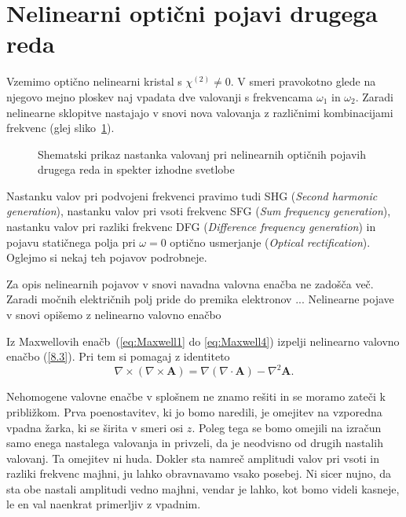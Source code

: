 \section{Nelinearni optični pojavi drugega reda}
Vzemimo optično nelinearni kristal s $\chi^{(2)} \neq 0$. V smeri pravokotno 
glede na njegovo mejno ploskev naj vpadata dve valovanji s frekvencama
$\omega_{1}$ in $\omega_{2}$. Zaradi nelinearne sklopitve nastajajo v snovi nova 
valovanja z različnimi kombinacijami frekvenc (glej sliko~\ref{fig:nl2}).
\begin{figure}[h]
\centering
\def\svgwidth{140truemm} 

\caption{Shematski prikaz nastanka valovanj pri nelinearnih optičnih pojavih drugega reda in spekter
izhodne svetlobe}
\label{fig:nl2}
\end{figure}

Nastanku valov pri podvojeni frekvenci pravimo tudi
SHG ({\it Second harmonic 
generation}), 
nastanku valov pri vsoti frekvenc SFG
({\it Sum frequency generation}), 
nastanku valov pri razliki frekvenc DFG 
({\it Difference frequency generation}) in pojavu 
statičnega polja pri $\omega = 0$ optično usmerjanje
({\it Optical rectification}). Oglejmo si nekaj teh pojavov podrobneje. 

Za opis nelinearnih pojavov v snovi navadna valovna enačba ne zadošča več. Zaradi močnih
električnih polj pride do premika elektronov ...
Nelinearne pojave v snovi opišemo z nelinearno valovno enačbo

\begin{definition}
Iz Maxwellovih enačb~(\ref{eq:Maxwell1} do \ref{eq:Maxwell4}) izpelji 
nelinearno valovno enačbo (\ref{8.3}). Pri tem si pomagaj z identiteto
$$
\nabla \times (\nabla \times \mathbf{A}) = \nabla (\nabla \cdot \mathbf{A}) 
- \nabla^2 \mathbf{A}.
$$
\end{definition} 

Nehomogene valovne enačbe v splošnem ne znamo rešiti in se moramo zateči k približkom.
Prva poenostavitev, ki jo bomo naredili, je omejitev na vzporedna vpadna žarka,
ki se širita v smeri osi $z$. Poleg tega se bomo omejili na izračun samo enega
nastalega valovanja in privzeli, da je neodvisno od drugih nastalih valovanj.
Ta omejitev ni huda. Dokler sta namreč amplitudi valov pri vsoti in razliki
frekvenc majhni, ju lahko obravnavamo vsako posebej. Ni sicer nujno,
da sta obe nastali amplitudi vedno majhni, vendar je lahko, kot bomo videli kasneje, 
le en val naenkrat primerljiv z vpadnim. 

